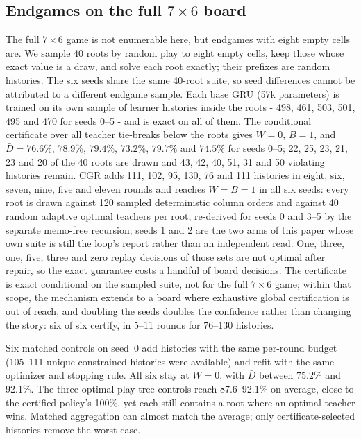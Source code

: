 \documentclass[conference]{IEEEtran}
\begin{document}
\subsection{Endgames on the full $7\times6$ board}
The full $7\times6$ game is not enumerable here, but endgames with eight empty cells are. We sample 40 roots by random play to eight empty cells, keep those whose exact value is a draw, and solve each root exactly; their prefixes are random histories. The six seeds share the same 40-root suite, so seed differences cannot be attributed to a different endgame sample. Each base GRU (57k parameters) is trained on its own sample of learner histories inside the roots - 498, 461, 503, 501, 495 and 470 for seeds 0--5 - and is exact on all of them. The conditional certificate over all teacher tie-breaks below the roots gives $W=0$, $B=1$, and $\bar D=76.6\%$, $78.9\%$, $79.4\%$, $73.2\%$, $79.7\%$ and $74.5\%$ for seeds 0--5; 22, 25, 23, 21, 23 and 20 of the 40 roots are drawn and 43, 42, 40, 51, 31 and 50 violating histories remain. CGR adds 111, 102, 95, 130, 76 and 111 histories in eight, six, seven, nine, five and eleven rounds and reaches $W=B=1$ in all six seeds: every root is drawn against 120 sampled deterministic column orders and against 40 random adaptive optimal teachers per root, re-derived for seeds 0 and 3--5 by the separate memo-free recursion; seeds 1 and 2 are the two arms of this paper whose own suite is still the loop's report rather than an independent read. One, three, one, five, three and zero replay decisions of those sets are not optimal after repair, so the exact guarantee costs a handful of board decisions. The certificate is exact conditional on the sampled suite, not for the full $7\times6$ game; within that scope, the mechanism extends to a board where exhaustive global certification is out of reach, and doubling the seeds doubles the confidence rather than changing the story: six of six certify, in 5--11 rounds for 76--130 histories.

Six matched controls on seed~0 add histories with the same per-round budget (105--111 unique constrained histories were available) and refit with the same optimizer and stopping rule. All six stay at $W=0$, with $\bar D$ between 75.2\% and 92.1\%. The three optimal-play-tree controls reach 87.6--92.1\% on average, close to the certified policy's 100\%, yet each still contains a root where an optimal teacher wins. Matched aggregation can almost match the average; only certificate-selected histories remove the worst case.
\end{document}
